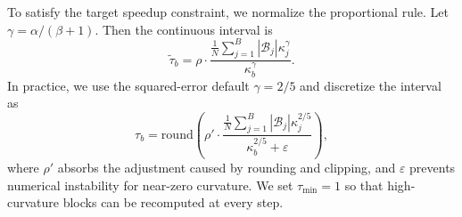 To satisfy the target speedup constraint, we normalize the proportional
rule. Let $\gamma=\alpha/(\beta+1)$. Then the continuous interval is
\begin{equation}
    \tilde{\tau}_b
    =
    \rho
    \cdot
    \frac{
    \frac{1}{N}
    \sum_{j=1}^{B}
    |\mathcal{B}_j|
    \kappa_j^\gamma
    }{
    \kappa_b^\gamma
    }.
    \label{eq:app_tau_closed_form}
\end{equation}
In practice, we use the squared-error default $\gamma=2/5$ and discretize
the interval as
\begin{equation}
    \tau_b
    =
    \mathrm{round}
    \left(
    \rho'
    \cdot
    \frac{
    \frac{1}{N}
    \sum_{j=1}^{B}
    |\mathcal{B}_j|
    \kappa_j^{2/5}
    }{
    \kappa_b^{2/5}+\varepsilon
    }
    \right),
    \label{eq:app_tau_discrete}
\end{equation}
where $\rho'$ absorbs the adjustment caused by rounding and clipping, and
$\varepsilon$ prevents numerical instability for near-zero curvature. We
set $\tau_{\min}=1$ so that high-curvature blocks can be recomputed at
every step.








